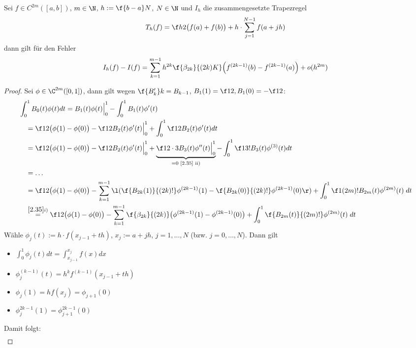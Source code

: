 \documentclass[11pt]{scrartcl}
\begin{document}
\begin{st}
	Sei $f\in C^{2m}([a,b])$, $m\in \N$, $h:= \f {b-a}N$, $N\in \N$ und $I_h$ die zusammengesetzte Trapezregel
	\[
		T_h(f) = \f h2 \big(f(a) + f(b)\big) + h \cdot \sum_{j=1}^{N-1} f(a+jh)
	\]
	dann gilt für den Fehler
	\[
		I_h(f) - I(f) = \sum_{k=1}^{m-1} h^{2k} \f{\beta_{2k}}{(2k)K} \Big( f^{(2k-1)}(b) - f^{(2k-1)}(a) \Big) + o(h^{2m})
	\]
	\begin{proof}
		Sei $\phi \in \C^{2m}([0,1])$, dann gilt wegen $\f{B_k'}k = B_{k-1}$, $B_1(1) = \f 12, B_1(0) = - \f 12$:
		\begin{align*}
			&\int_0^1 B_0(t) \phi(t) dt 
			= B_1(t) \phi(t) \Big|_{0}^1 - \int_0^1 B_1(t) \phi'(t) \\
			&\quad= \f 12 \big( \phi(1) - \phi(0) \big) - \f 12 B_2(t) \phi'(t) \Big|_0^1 + \int_0^1 \f 12 B_2(t) \phi'(t) dt \\
			&\quad= \f 12 \big( \phi(1) - \phi(0) \big) - \f 12 B_2(t) \phi'(t) \Big|_0^1 + \underbrace{\f 1{2\cdot 3} B_3(t) \phi''(t) \Big|_0^1}_{=0 \text{ \ref{2.35} ii)}} - \int_0^1 \f 1{3!} B_3(t) \phi^{(3)}(t) dt \\
			&\quad= \dotsc \\
			&\quad= \f 12 \big( \phi(1) - \phi(0) \big) - \sum_{k=1}^{m-1} \l( \f {B_{2k}(1)}{(2k)!} \phi^{(2k-1)}(1) - \f {B_{2k}(0)}{(2k)!} \phi^{(2k-1)}(0) \r) + \int_0^1 \f 1{(2m)!} B_{2m}(t) \phi^{(2m)}(t) \; dt \\
			&\quad\stackrel{\ref{2.35} i)}=  \f 12 \big(\phi(1) - \phi(0)\big) - \sum_{k=1}^{m-1} \f {\beta_{2k}}{(2k)} \big( \phi^{(2k-1)}(1) - \phi^{(2k-1)}(0) \big) + \int_0^1 \f {B_{2m}(t)}{(2m)!} \phi^{(2m)}(t) \; dt
		\end{align*}
		Wähle  $\phi_j(t) := h \cdot f(x_{j-1} + th)$, $x_j := a+jh$, $j=1,\dotsc, N$ (bzw. $j=0,\dotsc, N$).
		Dann gilt
		\begin{itemize}
			\item
				$\displaystyle
				\int_0^1 \phi_j(t) dt = \int_{x_{j-1}}^{x_j} f(x) dx
				$
			\item
				$\displaystyle
				\phi_j^{(k-1)}(t) = h^k f^{(k-1)}(x_{j-1} + th)
				$
			\item
				$\displaystyle
				\phi_j(1) = h f(x_j) = \phi_{j+1}(0)
				$
			\item
				$\displaystyle
				\phi_j^{2k-1}(1) = \phi_{j+1}^{2k-1}(0)
				$
		\end{itemize}
		Damit folgt:
		\begin{align*}

\end{align*}
\end{proof}
\end{st}
\end{document}
